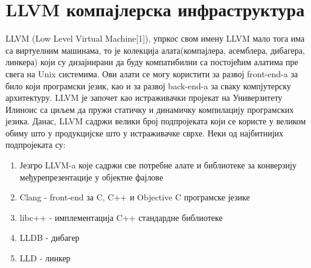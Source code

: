 \documentclass[12pt,oneside]{memoir}
\begin{document}
\chapter{LLVM компајлерска инфраструктура}
\label{chp:LLVM}

LLVM ({\lat Low Level Virtual Machine}[1]), упркос свом имену LLVM мало тога има са
виртуелним машинама, то је колекција алата(компајлера, асемблера, дибагера, линкера)
који су дизајнирани да буду компатибилни са постојећим алатима пре свега на 
Unix системима.
Ови алати  се могу користити за развој front-end-a за било који програмски језик, 
као и за развој back-end-a за сваку компјутерску архитектуру.
LLVM је започет као истраживачки пројекат на Универзитету Илиноис са циљем да 
пружи статичку и динамичку компилацију програмских језика. 
Данас, LLVM садржи велики број подпројеката који се користе у великом обиму 
што у продукцијске што у истраживачке сврхе.
\newline Неки од најбитнијих подпројеката су:
\begin{enumerate}
\item Језгро LLVM-a које садржи све потребне алате и библиотеке за конверзију
међурепрезентације у објектне фајлове 
\item Clang - front-end за  C, C++ и Objective C програмске језике
\item libc++ - имплементација C++ стандардне библиотеке
\item LLDB - дибагер
\item LLD - линкер
\end{enumerate}
\end{document}
